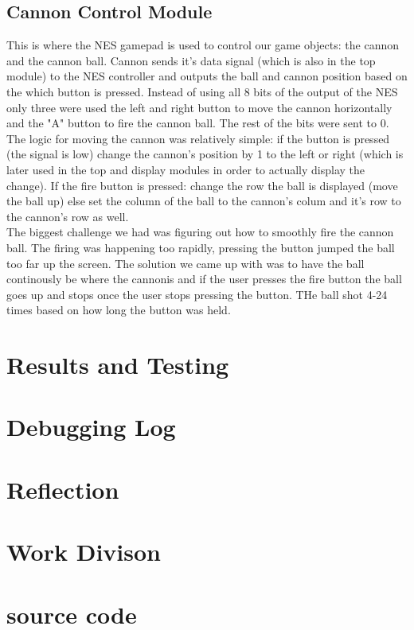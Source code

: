 \documentclass[12pt]{article}
\begin{document}
\begin{flushleft}
\subsection{Cannon Control Module}
This is where the NES gamepad is used to control our game objects: the cannon
and the cannon ball. Cannon sends it's data signal (which is also in the top
module) to the NES controller and outputs the ball and cannon position based on
the which button is pressed. Instead of using all 8 bits of the output of the
NES only three were used the left and right button to move the cannon
horizontally and the "A" button to fire the cannon ball. The rest of the bits
were sent to 0. \\
The logic for moving the cannon was relatively simple: if the button is pressed
(the signal is low) change the cannon's position by 1 to the left or right (which is later used in the top
and display modules in order to actually display the change). If the fire button
is pressed: change the row the ball is displayed (move the ball up) else set the
column of the ball to the cannon's colum and it's row to the cannon's row as
well. \\

The biggest challenge we had was figuring out how to smoothly fire the cannon
ball. The firing was happening too rapidly, pressing the button jumped the ball
too far up the screen. The solution we came up with was to have the ball
continously be where the cannonis and if the user presses the fire button the
ball goes up and stops once the user stops pressing the button. THe ball shot
4-24 times based on how long the button was held. 
\section{Results and Testing}

\section{Debugging Log}

\section{Reflection} 

\section{Work Divison} 

\section{source code}


\end{flushleft}
\end{document}
